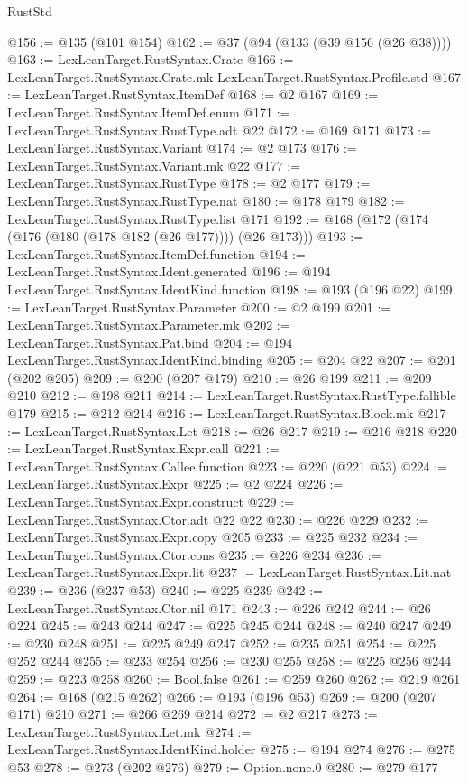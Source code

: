 \begin{lexlean}{RustStd}
\begin{coremodule}
{\begin{coremodule}
{{{{{{{@156 := @135 (@101 @154)
@162 := @37 (@94 (@133 (@39 @156 (@26 @38))))
@163 := LexLeanTarget.RustSyntax.Crate
@166 := LexLeanTarget.RustSyntax.Crate.mk LexLeanTarget.RustSyntax.Profile.std
@167 := LexLeanTarget.RustSyntax.ItemDef
@168 := @2 @167
@169 := LexLeanTarget.RustSyntax.ItemDef.enum
@171 := LexLeanTarget.RustSyntax.RustType.adt @22
@172 := @169 @171
@173 := LexLeanTarget.RustSyntax.Variant
@174 := @2 @173
@176 := LexLeanTarget.RustSyntax.Variant.mk @22
@177 := LexLeanTarget.RustSyntax.RustType
@178 := @2 @177
@179 := LexLeanTarget.RustSyntax.RustType.nat
@180 := @178 @179
@182 := LexLeanTarget.RustSyntax.RustType.list @171
@192 := @168 (@172 (@174 (@176 (@180 (@178 @182 (@26 @177)))) (@26 @173)))
@193 := LexLeanTarget.RustSyntax.ItemDef.function
@194 := LexLeanTarget.RustSyntax.Ident.generated
@196 := @194 LexLeanTarget.RustSyntax.IdentKind.function
@198 := @193 (@196 @22)
@199 := LexLeanTarget.RustSyntax.Parameter
@200 := @2 @199
@201 := LexLeanTarget.RustSyntax.Parameter.mk
@202 := LexLeanTarget.RustSyntax.Pat.bind
@204 := @194 LexLeanTarget.RustSyntax.IdentKind.binding
@205 := @204 @22
@207 := @201 (@202 @205)
@209 := @200 (@207 @179)
@210 := @26 @199
@211 := @209 @210
@212 := @198 @211
@214 := LexLeanTarget.RustSyntax.RustType.fallible @179
@215 := @212 @214
@216 := LexLeanTarget.RustSyntax.Block.mk
@217 := LexLeanTarget.RustSyntax.Let
@218 := @26 @217
@219 := @216 @218
@220 := LexLeanTarget.RustSyntax.Expr.call
@221 := LexLeanTarget.RustSyntax.Callee.function
@223 := @220 (@221 @53)
@224 := LexLeanTarget.RustSyntax.Expr
@225 := @2 @224
@226 := LexLeanTarget.RustSyntax.Expr.construct
@229 := LexLeanTarget.RustSyntax.Ctor.adt @22 @22
@230 := @226 @229
@232 := LexLeanTarget.RustSyntax.Expr.copy @205
@233 := @225 @232
@234 := LexLeanTarget.RustSyntax.Ctor.cons
@235 := @226 @234
@236 := LexLeanTarget.RustSyntax.Expr.lit
@237 := LexLeanTarget.RustSyntax.Lit.nat
@239 := @236 (@237 @53)
@240 := @225 @239
@242 := LexLeanTarget.RustSyntax.Ctor.nil @171
@243 := @226 @242
@244 := @26 @224
@245 := @243 @244
@247 := @225 @245 @244
@248 := @240 @247
@249 := @230 @248
@251 := @225 @249 @247
@252 := @235 @251
@254 := @225 @252 @244
@255 := @233 @254
@256 := @230 @255
@258 := @225 @256 @244
@259 := @223 @258
@260 := Bool.false
@261 := @259 @260
@262 := @219 @261
@264 := @168 (@215 @262)
@266 := @193 (@196 @53)
@269 := @200 (@207 @171) @210
@271 := @266 @269 @214
@272 := @2 @217
@273 := LexLeanTarget.RustSyntax.Let.mk
@274 := LexLeanTarget.RustSyntax.IdentKind.holder
@275 := @194 @274
@276 := @275 @53
@278 := @273 (@202 @276)
@279 := Option.none.{0}
@280 := @279 @177
}}}}}}}
\end{coremodule}}
\end{coremodule}
\end{lexlean}
